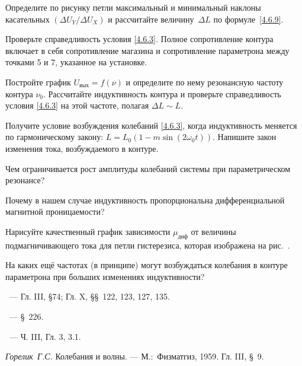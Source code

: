 \begin{lab:task}

\item
Определите по рисунку петли максимальный и минимальный наклоны касательных
$(\Delta U_Y/ \Delta U_X)$ и рассчитайте величину~$\Delta L$ по формуле~\eqref{4.6.9}.

Проверьте справедливость условия \eqref{4.6.3}. Полное сопротивление контура
включает в себя сопротивление магазина и сопротивление параметрона между точками
5 и 7, указанное на установке.

\item
Постройте график $U_\text{вых} = f(\nu)$ и определите по нему резонансную
частоту контура $\nu_0$. Рассчитайте индуктивность контура
и проверьте справедливость условия \eqref{4.6.3} на
этой частоте, полагая $\Delta L \sim L$.

\end{lab:task}


\begin{lab:questions}
\item
Получите условие возбуждения колебаний \eqref{4.6.3}, когда индуктивность
меняется по гармоническому закону: $L = L_0(1-m\sin(2\omega_0t))$. Напишите закон
изменения тока, возбуждаемого в контуре.

\item Чем ограничивается рост амплитуды колебаний системы при параметрическом резонансе?

\item
Почему в нашем случае индуктивность пропорциональна дифференциальной магнитной
проницаемости?

\item
Нарисуйте качественный график зависимости $\mu_\text{диф}$ от величины
подмагничивающего тока для петли гистерезиса, которая изображена на
рис.~.

\item
На каких ещё частотах (в принципе) могут возбуждаться колебания в контуре
параметрона при больших изменениях индуктивности?


\end{lab:questions}


\begin{lab:literature}
\item
\SivuhinIII~--- Гл. III, \S 74; Гл. X, \S\S~122, 123, 127, 135.

\item
\Kalashnikov~--- \S~226.

\item
\KingLokOlh~--- Ч. III, Гл. 3, 3.1.

\item
\textit{Горелик~Г.С.} Колебания и волны. --- М.:~Физматгиз, 1959. Гл. III, \S~9.

\end{lab:literature}
